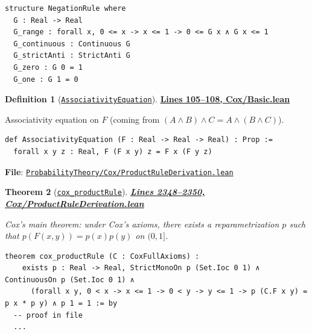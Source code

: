 \documentclass[11pt]{article}
\newtheorem{theorem}{Theorem}[section]
\theoremstyle{definition}
\newtheorem{definition}[theorem]{Definition}
\theoremstyle{remark}
\begin{document}
\begin{lstlisting}[caption={Cox negation rule interface}]
structure NegationRule where
  G : Real -> Real
  G_range : forall x, 0 <= x -> x <= 1 -> 0 <= G x ∧ G x <= 1
  G_continuous : Continuous G
  G_strictAnti : StrictAnti G
  G_zero : G 0 = 1
  G_one : G 1 = 0
\end{lstlisting}

\begin{definition}[\href{https://github.com/zariuq/ks-foundations-of-inference/blob/main/ProbabilityTheory/Cox/Basic.lean\#L107}{\texttt{AssociativityEquation}}]
\textbf{\href{https://github.com/zariuq/ks-foundations-of-inference/blob/main/ProbabilityTheory/Cox/Basic.lean\#L105-L108}{Lines 105--108, Cox/Basic.lean}}

Associativity equation on $F$ (coming from $(A\wedge B)\wedge C = A\wedge(B\wedge C)$).
\end{definition}

\begin{lstlisting}[caption={Associativity functional equation}]
def AssociativityEquation (F : Real -> Real -> Real) : Prop :=
  forall x y z : Real, F (F x y) z = F x (F y z)
\end{lstlisting}

\textbf{File}: \href{https://github.com/zariuq/ks-foundations-of-inference/blob/main/ProbabilityTheory/Cox/ProductRuleDerivation.lean}{\texttt{ProbabilityTheory/Cox/ProductRuleDerivation.lean}}

\begin{theorem}[\href{https://github.com/zariuq/ks-foundations-of-inference/blob/main/ProbabilityTheory/Cox/ProductRuleDerivation.lean\#L2348}{\texttt{cox\_productRule}}]
\textbf{\href{https://github.com/zariuq/ks-foundations-of-inference/blob/main/ProbabilityTheory/Cox/ProductRuleDerivation.lean\#L2348-L2350}{Lines 2348--2350, Cox/ProductRuleDerivation.lean}}

Cox's main theorem: under Cox's axioms, there exists a reparametrization $p$ such that
$p(F(x,y)) = p(x)p(y)$ on $(0,1]$.
\end{theorem}

\begin{lstlisting}[caption={Cox product rule theorem (reparametrized)}]
theorem cox_productRule (C : CoxFullAxioms) :
    exists p : Real -> Real, StrictMonoOn p (Set.Ioc 0 1) ∧ ContinuousOn p (Set.Ioc 0 1) ∧
      (forall x y, 0 < x -> x <= 1 -> 0 < y -> y <= 1 -> p (C.F x y) = p x * p y) ∧ p 1 = 1 := by
  -- proof in file
  ...
\end{lstlisting}
\end{document}
